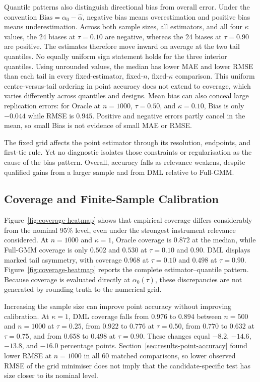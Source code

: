 Quantile patterns also distinguish directional bias from overall error. Under the convention $\mathrm{Bias}=\alpha_0-\widehat\alpha$, negative bias means overestimation and positive bias means underestimation. Across both sample sizes, all estimators, and all four $\kappa$ values, the 24 biases at $\tau=0.10$ are negative, whereas the 24 biases at $\tau=0.90$ are positive. The estimates therefore move inward on average at the two tail quantiles. No equally uniform sign statement holds for the three interior quantiles. Using unrounded values, the median has lower MAE and lower RMSE than each tail in every fixed-estimator, fixed-$n$, fixed-$\kappa$ comparison. This uniform centre-versus-tail ordering in point accuracy does not extend to coverage, which varies differently across quantiles and designs. Mean bias can also conceal large replication errors: for Oracle at $n=1000$, $\tau=0.50$, and $\kappa=0.10$, Bias is only $-0.044$ while RMSE is $0.945$. Positive and negative errors partly cancel in the mean, so small Bias is not evidence of small MAE or RMSE.

The fixed grid affects the point estimator through its resolution, endpoints, and first-tie rule. Yet no diagnostic isolates those constraints or regularisation as the cause of the bias pattern. Overall, accuracy falls as relevance weakens, despite qualified gains from a larger sample and from DML relative to Full-GMM.

\subsection{Coverage and Finite-Sample Calibration}
\label{sec:results-coverage}

Figure~\ref{fig:coverage-heatmap} shows that empirical coverage differs considerably from the nominal 95\% level, even under the strongest instrument relevance considered. At $n=1000$ and $\kappa=1$, Oracle coverage is $0.872$ at the median, while Full-GMM coverage is only $0.502$ and $0.530$ at $\tau=0.10$ and $0.90$. DML displays marked tail asymmetry, with coverage $0.968$ at $\tau=0.10$ and $0.498$ at $\tau=0.90$. Figure~\ref{fig:coverage-heatmap} reports the complete estimator--quantile pattern. Because coverage is evaluated directly at $\alpha_0(\tau)$, these discrepancies are not generated by rounding truth to the numerical grid.



Increasing the sample size can improve point accuracy without improving calibration. At $\kappa=1$, DML coverage falls from $0.976$ to $0.894$ between $n=500$ and $n=1000$ at $\tau=0.25$, from $0.922$ to $0.776$ at $\tau=0.50$, from $0.770$ to $0.632$ at $\tau=0.75$, and from $0.658$ to $0.498$ at $\tau=0.90$. These changes equal $-8.2$, $-14.6$, $-13.8$, and $-16.0$ percentage points. Section~\ref{sec:results-point-accuracy} found lower RMSE at $n=1000$ in all 60 matched comparisons, so lower observed RMSE of the grid minimiser does not imply that the candidate-specific test has size closer to its nominal level.

